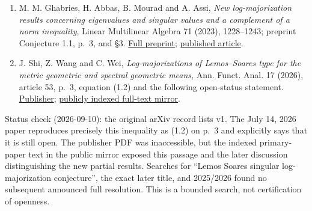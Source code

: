 \documentclass[11pt,a4paper]{article}
\providecommand{\tightlist}{\setlength{\itemsep}{0pt}\setlength{\parskip}{0pt}}
\begin{document}
\begin{enumerate}
\def\labelenumi{\arabic{enumi}.}
\tightlist
\item
  M. M. Ghabries, H. Abbas, B. Mourad and A. Assi, \emph{New
  log-majorization results concerning eigenvalues and singular values
  and a complement of a norm inequality}, Linear Multilinear Algebra 71
  (2023), 1228--1243; preprint Conjecture 1.1, p.~3, and §3.
  \href{https://arxiv.org/pdf/2105.13356}{Full preprint};
  \href{https://doi.org/10.1080/03081087.2022.2059050}{published
  article}.
\item
  J. Shi, Z. Wang and C. Wei, \emph{Log-majorizations of Lemos--Soares
  type for the metric geometric and spectral geometric means}, Ann.
  Funct. Anal. 17 (2026), article 53, p.~3, equation (1.2) and the
  following open-status statement.
  \href{https://doi.org/10.1007/s43034-026-00532-x}{Publisher};
  \href{https://www.scribd.com/document/1073369698/s43034-026-00532-x}{publicly
  indexed full-text mirror}.
\end{enumerate}

Status check (2026-09-10): the original arXiv record lists v1. The July
14, 2026 paper reproduces precisely this inequality as (1.2) on p.~3 and
explicitly says that it is still open. The publisher PDF was
inaccessible, but the indexed primary-paper text in the public mirror
exposed this passage and the later discussion distinguishing the new
partial results. Searches for ``Lemos Soares singular log-majorization
conjecture'', the exact later title, and 2025/2026 found no subsequent
announced full resolution. This is a bounded search, not certification
of openness.
\end{document}
